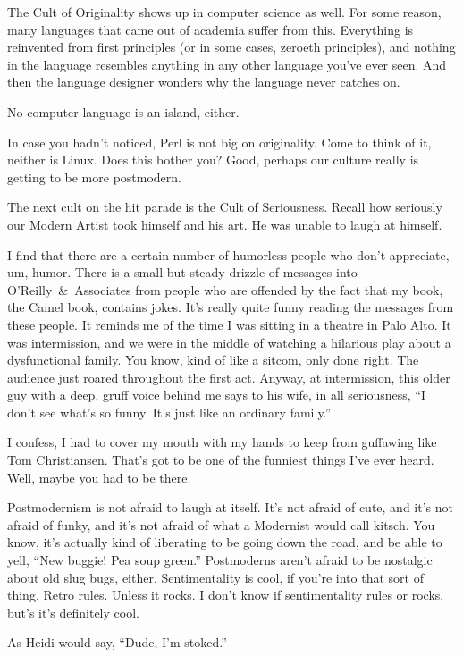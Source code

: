 The Cult of Originality shows up in computer science as well. For some
reason, many languages that came out of academia suffer from this. Everything
is reinvented from first principles (or in some cases, zeroeth principles),
and nothing in the language resembles anything in any other language you've
ever seen. And then the language designer wonders why the language never
catches on.

No computer language is an island, either.

In case you hadn't noticed, Perl is not big on originality. Come to think of
it, neither is Linux. Does this bother you? Good, perhaps our culture really
is getting to be more postmodern.

The next cult on the hit parade is the Cult of Seriousness. Recall how
seriously our Modern Artist took himself and his art. He was unable to laugh
at himself.

I find that there are a certain number of humorless people who don't
appreciate, um, humor. There is a small but steady drizzle of messages into
O'Reilly~\&~Associates from people who are offended by the fact that my book,
the Camel book, contains jokes. It's really quite funny reading the messages
from these people. It reminds me of the time I was sitting in a theatre in
Palo Alto. It was intermission, and we were in the middle of watching a
hilarious play about a dysfunctional family. You know, kind of like a sitcom,
only done right. The audience just roared throughout the first act. Anyway,
at intermission, this older guy with a deep, gruff voice behind me says to
his wife, in all seriousness, ``I don't see what's so funny. It's just like
an ordinary family.''

I confess, I had to cover my mouth with my hands to keep from guffawing like
Tom Christiansen. That's got to be one of the funniest things I've ever
heard. Well, maybe you had to be there.

Postmodernism is not afraid to laugh at itself. It's not afraid of cute, and
it's not afraid of funky, and it's not afraid of what a Modernist would call
kitsch. You know, it's actually kind of liberating to be going down the road,
and be able to yell, ``New buggie! Pea soup green.'' Postmoderns aren't
afraid to be nostalgic about old slug bugs, either. Sentimentality is cool,
if you're into that sort of thing. Retro rules. Unless it rocks. I don't know
if sentimentality rules or rocks, but's it's definitely cool.

As Heidi would say, ``Dude, I'm stoked.''

